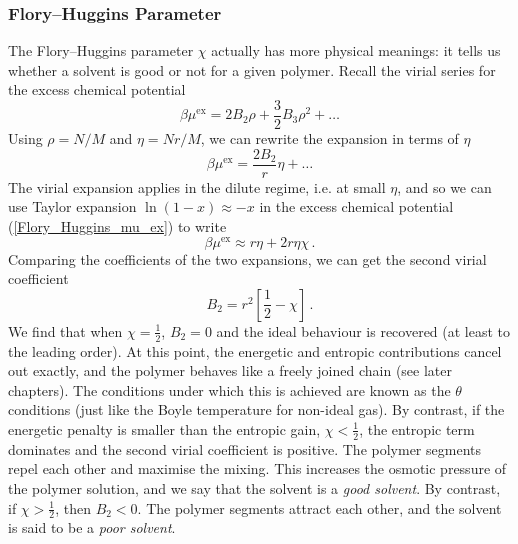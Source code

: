 \documentclass{article}
\theoremstyle{plain}\theoremheaderfont{\normalfont\bfseries}\theorembodyfont{\rmfamily}\theoremseparator{.}\newtheorem*{thm}{Theorem}\newtheorem*{law}{Law}\newtheorem*{pos}{Postulate}
\numberwithin{equation}{section}
\begin{document}
    \subsubsection{Flory--Huggins Parameter}
    The Flory--Huggins parameter \(\chi\) actually has more physical meanings: it tells us whether a solvent is good or not for a given polymer. Recall the virial series for the excess chemical potential
    \begin{equation}
        \beta\mu^{\text{ex}}=2B_2\rho+\frac{3}{2}B_3\rho^2+\dots
    \end{equation}
    Using \(\rho=N/M\) and \(\eta=Nr/M\), we can rewrite the expansion in terms of \(\eta\)
    \begin{equation}
        \beta\mu^{\text{ex}}=\frac{2B_2}{r}\eta+\dots
    \end{equation}
    The virial expansion applies in the dilute regime, i.e. at small \(\eta\), and so we can use Taylor expansion \(\ln(1-x)\approx -x\) in the excess chemical potential (\ref{Flory_Huggins_mu_ex}) to write
    \begin{equation}
        \beta\mu^{\text{ex}}\approx r\eta+2r\eta\chi\,.
    \end{equation}
    Comparing the coefficients of the two expansions, we can get the second virial coefficient
    \begin{equation}
        B_2=r^2\left[\frac{1}{2}-\chi\right]\,.
    \end{equation}
    We find that when \(\chi=\frac{1}{2}\), \(B_2=0\) and the ideal behaviour is recovered (at least to the leading order). At this point, the energetic and entropic contributions cancel out exactly, and the polymer behaves like a freely joined chain (see later chapters). The conditions under which this is achieved are known as the \(\theta\) conditions (just like the Boyle temperature for non-ideal gas). By contrast, if the energetic penalty is smaller than the entropic gain, \(\chi<\frac{1}{2}\), the entropic term dominates and the second virial coefficient is positive. The polymer segments repel each other and maximise the mixing. This increases the osmotic pressure of the polymer solution, and we say that the solvent is a \textit{good solvent}. By contrast, if \(\chi>\frac{1}{2}\), then \(B_2<0\). The polymer segments attract each other, and the solvent is said to be a \textit{poor solvent}.
\end{document}
